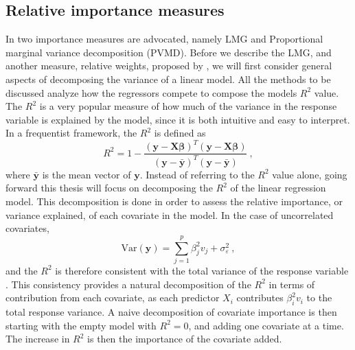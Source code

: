 \subsection{Relative importance measures}
\label{sec:rel_imp}
In \citet{gromping_relaimpo} two importance measures are advocated, namely LMG and Proportional marginal variance decomposition (PVMD).
Before we describe the LMG, and another measure, relative weights, proposed by \citet{johnson_relative_weights}, we will first consider general aspects of decomposing the variance of a linear model.
All the methods to be discussed analyze how the regressors compete to compose the models $R^2$ value. The $R^2$ is a very popular measure of how much of the variance in the response variable is explained by the model, since it is both intuitive and easy to interpret.
In a frequentist framework, the $R^2$ is defined as
\begin{equation}
    R^2 = 1 - \frac{(\mathbf{y}-\mathbf{X}\boldsymbol{\beta})^T(\mathbf{y}-\mathbf{X}\boldsymbol{\beta})}{(\mathbf{y}-\bar{\mathbf{y}})^T(\mathbf{y}-\bar{\mathbf{y}})} \ ,
\end{equation}
where $\bar{\mathbf{y}}$ is the mean vector of $\mathbf{y}$. 
Instead of referring to the $R^2$ value alone, going forward this thesis will focus on decomposing the $R^2$ of the linear regression model. 
This decomposition is done in order to assess the relative importance, or variance explained, of each covariate in the model.
In the case of uncorrelated covariates, 
\begin{equation}
    \text{Var}(\mathbf{y}) = \sum_{j=1}^p\beta_j^2v_j + \sigma_{\varepsilon}^2 \ ,
\end{equation}
and the $R^2$ is therefore consistent with the total variance of the response variable \citep{gromping_relaimpo}. 
This consistency provides a natural decomposition of the $R^2$ in terms of contribution from each covariate, as each predictor $X_i$ contributes $\beta_i^2v_i$ to the total response variance.
A naive decomposition of covariate importance is then starting with the empty model with $R^2=0$, and adding one covariate at a time. The increase in $R^2$ is then the importance of the covariate added.
